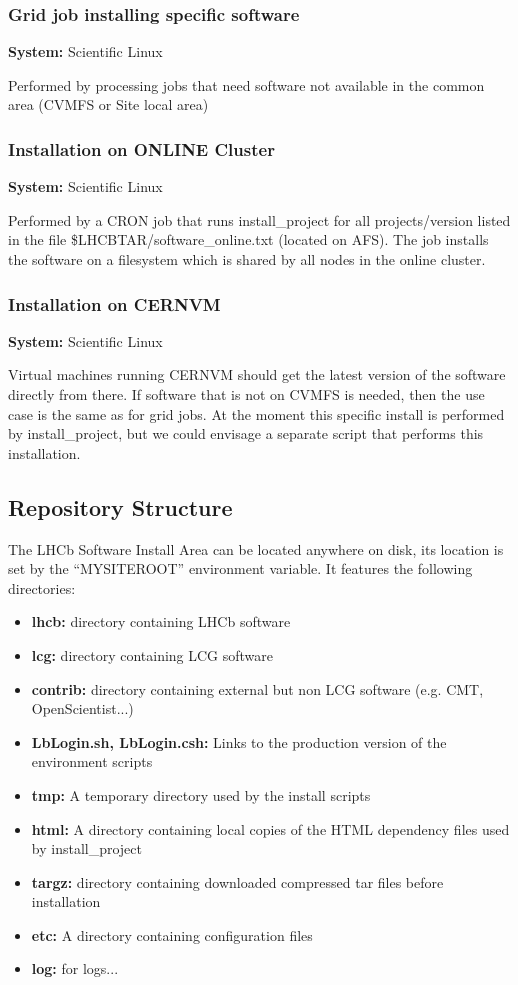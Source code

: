\documentclass{lhcbnote}
\begin{document}
\subsubsection{Grid job installing specific software}
\textbf{System:} Scientific Linux

Performed by processing jobs that need software not available in the common area (CVMFS or Site local area)

\subsubsection{Installation on ONLINE Cluster}
\textbf{System:} Scientific Linux

Performed by a CRON job that runs install\_project for all projects/version listed in the file \$LHCBTAR/software\_online.txt (located on AFS). The job installs the software on a filesystem which is shared by all nodes in the online cluster.

\subsubsection{Installation on CERNVM}
\textbf{System:} Scientific Linux

Virtual machines running CERNVM should get the latest version of the software directly from there. If software that is not on CVMFS is needed, then the use case is the same as for grid jobs. At the moment this specific install is performed by install\_project, but we could envisage a separate script that performs this installation.



\subsection{Repository Structure}

The LHCb Software Install Area can be located anywhere on disk, its location is set by the ``MYSITEROOT'' environment variable. It features the following directories:

\begin{itemize}
\item \textbf{lhcb:} directory containing LHCb software
\item \textbf{lcg:} directory containing LCG software
\item \textbf{contrib:} directory containing external but non LCG software (e.g. CMT, OpenScientist...)
\item \textbf{LbLogin.sh, LbLogin.csh:} Links to the production version of the environment scripts
\item \textbf{tmp:} A temporary directory used by the install scripts
\item \textbf{html:} A directory containing local copies of the HTML dependency files used by install\_project
\item \textbf{targz:} directory containing downloaded compressed tar files before installation
\item \textbf{etc:} A directory containing configuration files
\item \textbf{log:} for logs...
\end{itemize}
\end{document}
